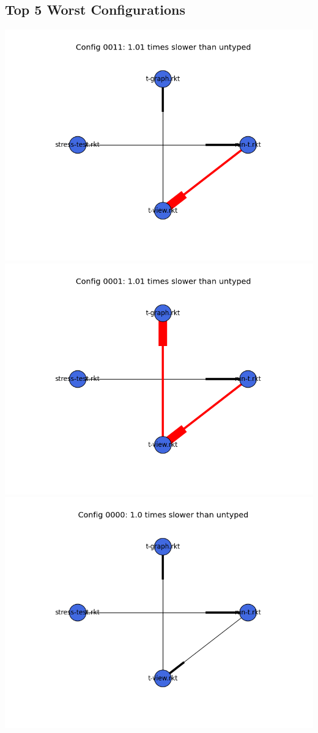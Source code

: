 \documentclass{article}
\begin{document}
\begin{itemize}
\subsection{Top 5 Worst Configurations}
\includegraphics[width=\textwidth]{mbta-2015-03-26-module-graph-0011.png}
\includegraphics[width=\textwidth]{mbta-2015-03-26-module-graph-0001.png}
\includegraphics[width=\textwidth]{mbta-2015-03-26-module-graph-0000.png}

\end{itemize}
\end{document}
